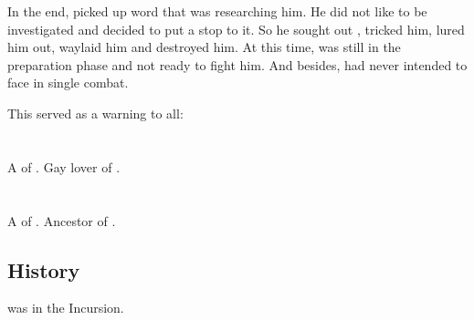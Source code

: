 In the end, \Ishnaruchaefir{} picked up word that \Lothagiel{} was researching him. 
He did not like to be investigated and decided to put a stop to it. 
So he sought out \Lothagiel, tricked him, lured him out, waylaid him and destroyed him. 
At this time, \Lothagiel{} was still in the preparation phase and not ready to fight him. 
And besides, \Lothagiel{} had never intended to face \Ishnaruchaefir{} in single combat. 

This served as a warning to all: 















\section{\Nemuragh}
\index{\Nemuragh}
A \thelyad{} \resphan{} of \TiphredSerah. 
Gay lover of \Lothagiel. 















\section{\Quelthah}
\index{\Quelthah}
A \sathariah \resphan{} of \TiphredSerah. 
Ancestor of . 









\subsection{History}
\Quelthah was  in the Incursion.






















